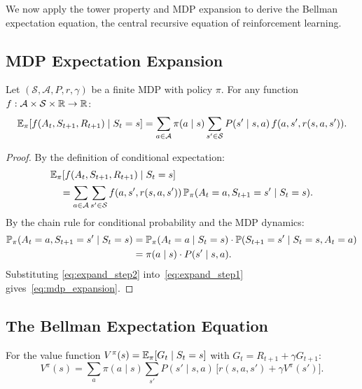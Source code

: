 \documentclass[11pt,a4paper]{article}
\begin{document}
We now apply the tower property and MDP expansion to derive the
Bellman expectation equation, the central recursive equation of
reinforcement learning.

\subsection{MDP Expectation Expansion}
\label{subsec:mdp_expansion}

\begin{theorem}
\label{thm:mdp_expansion}
Let $(\mathcal{S}, \mathcal{A}, P, r, \gamma)$ be a finite MDP
with policy $\pi$.  For any function
$f: \mathcal{A} \times \mathcal{S} \times \mathbb{R} \to \mathbb{R}$:
\begin{equation}
  \mathbb{E}_\pi[f(A_t, S_{t+1}, R_{t+1}) \mid S_t = s]
  = \sum_{a \in \mathcal{A}} \pi(a \mid s)
    \sum_{s' \in \mathcal{S}} P(s' \mid s, a)\,
    f(a, s', r(s,a,s')).
  \label{eq:mdp_expansion}
\end{equation}
\end{theorem}

\begin{proof}
By the definition of conditional expectation:
\begin{align}
  &\mathbb{E}_\pi[f(A_t, S_{t+1}, R_{t+1}) \mid S_t = s]
  \nonumber\\
  &\quad= \sum_{a \in \mathcal{A}} \sum_{s' \in \mathcal{S}}
    f(a, s', r(s,a,s'))\,
    \mathbb{P}_\pi(A_t = a, S_{t+1} = s' \mid S_t = s).
  \label{eq:expand_step1}
\end{align}
By the chain rule for conditional probability and the MDP
dynamics:
\begin{align}
  \mathbb{P}_\pi(A_t = a, S_{t+1} = s' \mid S_t = s)
  &= \mathbb{P}_\pi(A_t = a \mid S_t = s)
    \cdot \mathbb{P}(S_{t+1} = s' \mid S_t = s, A_t = a)
  \nonumber\\
  &= \pi(a \mid s) \cdot P(s' \mid s, a).
  \label{eq:expand_step2}
\end{align}
Substituting \eqref{eq:expand_step2}
into~\eqref{eq:expand_step1}
gives~\eqref{eq:mdp_expansion}.
\end{proof}

\subsection{The Bellman Expectation Equation}
\label{subsec:bellman_eq}

\begin{keyresult}[title={Bellman Expectation Equation}]
\begin{corollary}
\label{cor:bellman}
For the value function
$V^\pi(s) = \mathbb{E}_\pi[G_t \mid S_t = s]$ with
$G_t = R_{t+1} + \gamma G_{t+1}$:
\begin{equation}
  V^\pi(s) = \sum_{a} \pi(a \mid s) \sum_{s'}
  P(s' \mid s, a)\, \bigl[r(s,a,s') + \gamma V^\pi(s')\bigr].
  \label{eq:bellman}
\end{equation}
\end{corollary}
\end{keyresult}
\end{document}
